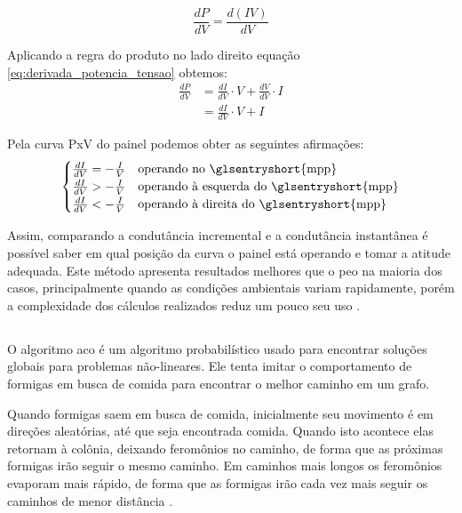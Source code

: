 \begin{equation} \label{eq:derivada_potencia_tensao}
\frac{dP}{dV} = \frac{d(IV)}{dV}
\end{equation}

Aplicando a regra do produto no lado direito equação \ref{eq:derivada_potencia_tensao} obtemos:
\begin{equation}
\begin{aligned}
\frac{dP}{dV} &= \frac{dI}{dV}\cdot V + \frac{dV}{dV}\cdot I \\
&= \frac{dI}{dV}\cdot V + I
\end{aligned}
\end{equation}

Pela curva PxV do painel podemos obter as seguintes afirmações:
\begin{gather*}
\begin{cases}
\frac{dI}{dV} = -\frac{I}{V} & \text{operando no \glsentryshort{mpp}} \\
\frac{dI}{dV} > -\frac{I}{V} & \text{operando à esquerda do \glsentryshort{mpp}} \\
\frac{dI}{dV} < -\frac{I}{V} & \text{operando à direita do \glsentryshort{mpp}}
\end{cases}
\end{gather*}

Assim, comparando a condutância incremental e a condutância instantânea é possível saber em qual posição da curva o painel está operando e tomar a atitude adequada. Este método apresenta resultados melhores que o \gls{peo} na maioria dos casos, principalmente quando as condições ambientais variam rapidamente, porém a complexidade dos cálculos realizados reduz um pouco seu uso \cite{tofoli2015}.

\subsection{}

O algoritmo \gls{aco} é um algoritmo probabilístico usado para encontrar soluções globais para problemas não-lineares. Ele tenta imitar o comportamento de formigas em busca de comida para encontrar o melhor caminho em um grafo.

Quando formigas saem em busca de comida, inicialmente seu movimento é em direções aleatórias, até que seja encontrada comida. Quando isto acontece elas retornam à colônia, deixando feromônios no caminho, de forma que as próximas formigas irão seguir o mesmo caminho. Em caminhos mais longos os feromônios evaporam mais rápido, de forma que as formigas irão cada vez mais seguir os caminhos de menor distância \cite{dorigo2006}.

